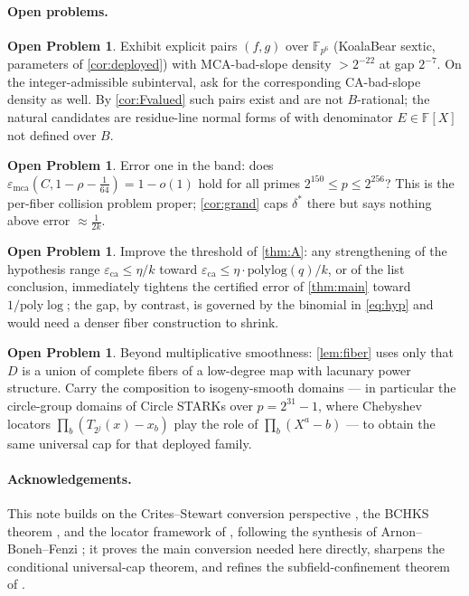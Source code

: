 \documentclass[11pt]{article}
\theoremstyle{definition}
\newtheorem{problem}[theorem]{Open Problem}
\theoremstyle{remark}
\newcommand{\F}{\mathbb{F}}
\newcommand{\B}{B}
\newcommand{\eca}{\varepsilon_{\mathrm{ca}}}
\newcommand{\emca}{\varepsilon_{\mathrm{mca}}}
\begin{document}
\paragraph{Open problems.}

\begin{problem}\label{prob:explicit}
Exhibit explicit pairs $(f,g)$ over $\F_{p^6}$ (KoalaBear sextic, parameters of \cref{cor:deployed}) with MCA-bad-slope density $>2^{-22}$ at gap $2^{-7}$. On the integer-admissible subinterval, ask for the corresponding CA-bad-slope density as well. By \cref{cor:Fvalued} such pairs exist and are not $\B$-rational; the natural candidates are residue-line normal forms of \cite{Cho26b} with denominator $E\in\F[X]$ not defined over $\B$.
\end{problem}

\begin{problem}\label{prob:errorone}
Error one in the band: does $\emca(C,1-\rho-\frac1{64})=1-o(1)$ hold for all primes $2^{150}\le p\le2^{256}$? This is the per-fiber collision problem proper; \cref{cor:grand} caps $\delta^*$ there but says nothing above error $\approx\frac1{2k}$.
\end{problem}

\begin{problem}
Improve the threshold of \cref{thm:A}: any strengthening of the hypothesis range $\eca\le\eta/k$ toward $\eca\le\eta\cdot\mathrm{polylog}(q)/k$, or of the list conclusion, immediately tightens the certified error of \cref{thm:main} toward $1/\mathrm{poly}\log$; the gap, by contrast, is governed by the binomial in \eqref{eq:hyp} and would need a denser fiber construction to shrink.
\end{problem}

\begin{problem}
Beyond multiplicative smoothness: \cref{lem:fiber} uses only that $D$ is a union of complete fibers of a low-degree map with lacunary power structure. Carry the composition to isogeny-smooth domains --- in particular the circle-group domains of Circle STARKs over $p=2^{31}-1$, where Chebyshev locators $\prod_b(T_{2^j}(x)-x_b)$ play the role of $\prod_b(X^a-b)$ --- to obtain the same universal cap for that deployed family.
\end{problem}

\paragraph{Acknowledgements.} This note builds on the Crites--Stewart conversion perspective \cite{CS25}, the BCHKS theorem \cite{BCHKS25}, and the locator framework of \cite{Cho26a,Cho26b}, following the synthesis of Arnon--Boneh--Fenzi \cite{ABF26}; it proves the main conversion needed here directly, sharpens the conditional universal-cap theorem, and refines the subfield-confinement theorem of \cite{Cho26b}.
\end{document}
